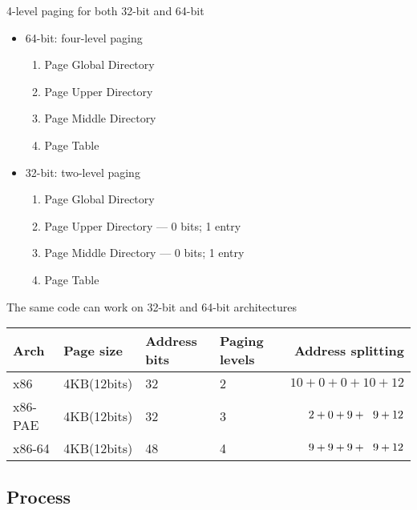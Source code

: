 \begin{frame}%
  \begin{block}{4-level paging for both 32-bit and 64-bit}
    \begin{itemize}
    \item \alert{64-bit: four-level paging}
      \begin{enumerate}
      \item Page Global Directory
      \item Page Upper Directory
      \item Page Middle Directory
      \item Page Table
      \end{enumerate}
    \item \alert{32-bit: two-level paging}
      \begin{enumerate}
      \item Page Global Directory
      \item Page Upper Directory --- 0 bits; 1 entry
      \item Page Middle Directory --- 0 bits; 1 entry
      \item Page Table
      \end{enumerate}
    \end{itemize}
    \alert{The same code can work on 32-bit and 64-bit architectures}
  \end{block}
    \begin{center}
    \begin{scriptsize}
      \begin{tabular}{llm{3em}m{3em}r}
        \hline
        Arch&Page size&Address bits&Paging levels&Address splitting\\\hline
        x86 &4KB(12bits) &32 &2 &$10+0+0+10+12$\\
        x86-PAE&4KB(12bits)&32&3&$2+0+9+\hspace{.6em}9+12$\\
        x86-64&4KB(12bits)&48&4&$9+9+9+\hspace{.6em}9+12$\\\hline
      \end{tabular}
    \end{scriptsize}
  \end{center}
\end{frame}


\subsection{Process}
\label{sec:process}

